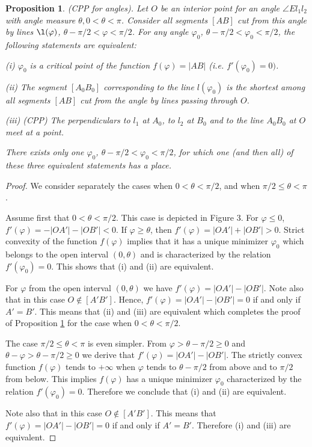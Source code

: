 \documentclass[a4paper,12pt]{amsart}
\newtheorem{prop}[thm]{Proposition}
\begin{document}
\begin{prop} \label{mainprop}
(CPP for angles). Let $O$ be an interior point for an angle $\angle El_1l_2$ with angle measure $\theta, 0<\theta < \pi$. Consider all segments $[AB]$ cut from this angle by lines $\l(\varphi)$, $ \theta - \pi/2 < \varphi < \pi/2$.  For any angle  $\varphi_0$, $ \theta - \pi/2 < \varphi_0 < \pi/2$, the following statements are equivalent:

(i) $\varphi_0$ is a critical point of the function $f(\varphi)=
|AB|$ (i.e. $f'(\varphi_0) = 0)$.

(ii) The segment $[A_0B_0]$ corresponding to the line
$l(\varphi_0)$ is the shortest among all segments $[AB]$ cut from
the angle by lines passing through $O$.

(iii)  (CPP) The perpendiculars to $l_1$ at $A_0$, to $l_2$ at
$B_0$ and to the line $A_0B_0$ at $O$ meet at a point.

There exists only one  $\varphi_0$, $ \theta - \pi/2 < \varphi_0 < \pi/2$, for which one (and then all) of these three equivalent statements has a place.

\end{prop}

\begin{proof}
 We consider separately the cases when $0< \theta< \pi/2$, and when  $\pi/2  \leq  \theta < \pi$.

\smallskip

Assume  first that $0 < \theta< \pi/2$. This case is depicted in
Figure 3. For $\varphi \leq 0$, $f'(\varphi) = -|OA'| - |OB'| <0$.
If $\varphi \geq \theta$, then $f'(\varphi) = |OA'| + |OB'| >0$.
Strict convexity of the function $f(\varphi)$ implies that it has
a unique minimizer $\varphi_0$ which belongs to the open interval
$(0, \theta)$ and is characterized by the relation
$f'(\varphi_0)=0$.  This shows that (i) and (ii) are equivalent.

For $\varphi$ from the open interval $(0, \theta)$ we have $f'(\varphi) = |OA'| - |OB'|$. Note also that in this case $O \not \in [A'B']$.
Hence, $f'(\varphi) = |OA'| - |OB'| =0$ if and only if $A'=B'$. This means that (ii) and (iii) are equivalent which completes the proof of Proposition \ref{mainprop}
for the case when $0< \theta< \pi/2$.

\smallskip

The case $\pi/2 \leq \theta < \pi$ is even simpler. From $\varphi
> \theta - \pi/2 \geq 0$ and  $\theta - \varphi > \theta - \pi/2
\geq 0$ we derive that $f'(\varphi) = |OA'| - |OB'|$. The strictly
convex function $f(\varphi)$  tends to $+\infty$ when $\varphi $
tends to $ \theta - \pi/2$ from above and
 to $\pi/2 $ from below.
This implies  $f(\varphi) $ has a unique minimizer $\varphi_0$
characterized by the relation $f'(\varphi_0)=0$. Therefore we
conclude that (i) and (ii) are equivalent.

Note also that in this case $O\not \in [A'B']$. This means that $f'(\varphi) = |OA'| - |OB'| =0$ if and only if $A'=B'$. Therefore (i) and (iii) are equivalent.

\end{proof}
\end{document}

